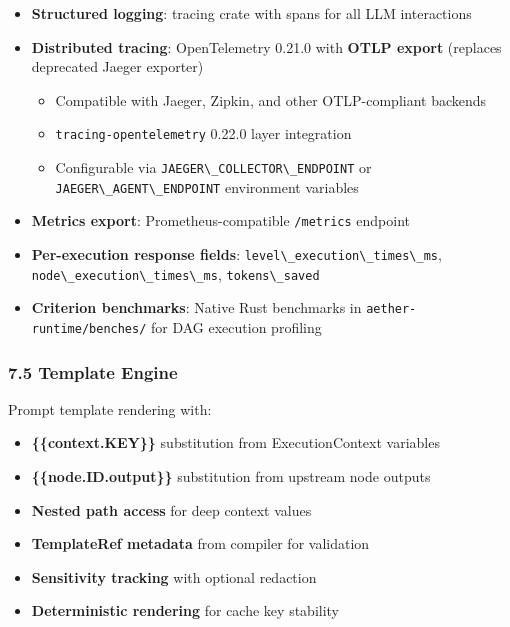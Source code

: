 \documentclass[
]{article}
\newcommand{\passthrough}[1]{#1}
\providecommand{\tightlist}{%
  \setlength{\itemsep}{0pt}\setlength{\parskip}{0pt}}
\begin{document}
\begin{itemize}
\tightlist
\item
  \textbf{Structured logging}: tracing crate with spans for all LLM
  interactions
\item
  \textbf{Distributed tracing}: OpenTelemetry 0.21.0 with \textbf{OTLP
  export} (replaces deprecated Jaeger exporter)

  \begin{itemize}
  \tightlist
  \item
    Compatible with Jaeger, Zipkin, and other OTLP-compliant backends
  \item
    \passthrough{\lstinline!tracing-opentelemetry!} 0.22.0 layer
    integration
  \item
    Configurable via
    \passthrough{\lstinline!JAEGER\_COLLECTOR\_ENDPOINT!} or
    \passthrough{\lstinline!JAEGER\_AGENT\_ENDPOINT!} environment
    variables
  \end{itemize}
\item
  \textbf{Metrics export}: Prometheus-compatible
  \passthrough{\lstinline!/metrics!} endpoint
\item
  \textbf{Per-execution response fields}:
  \passthrough{\lstinline!level\_execution\_times\_ms!},
  \passthrough{\lstinline!node\_execution\_times\_ms!},
  \passthrough{\lstinline!tokens\_saved!}
\item
  \textbf{Criterion benchmarks}: Native Rust benchmarks in
  \passthrough{\lstinline!aether-runtime/benches/!} for DAG execution
  profiling
\end{itemize}

\subsubsection{7.5 Template Engine}\label{template-engine}

Prompt template rendering with:

\begin{itemize}
\tightlist
\item
  \textbf{\{\{context.KEY\}\}} substitution from ExecutionContext
  variables
\item
  \textbf{\{\{node.ID.output\}\}} substitution from upstream node
  outputs
\item
  \textbf{Nested path access} for deep context values
\item
  \textbf{TemplateRef metadata} from compiler for validation
\item
  \textbf{Sensitivity tracking} with optional redaction
\item
  \textbf{Deterministic rendering} for cache key stability
\end{itemize}
\end{document}
